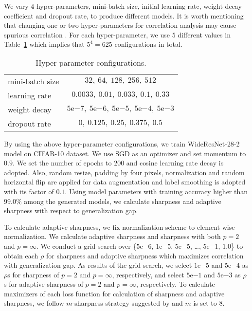 \documentclass{article}
\begin{document}
We vary $4$ hyper-parameters, mini-batch size, initial learning rate, weight decay coefficient and dropout rate, to produce different models. It is worth mentioning that changing one or two hyper-parameters for correlation analysis may cause spurious correlation \cite{jiang2019fantastic}. For each hyper-parameter, we use $5$ different values in Table~\ref{hyper} which implies that $5^4=625$ configurations in total.

\begin{table}[h]
\centering
\captionsetup{justification=centering}
\caption{Hyper-parameter configurations. \label{hyper}}
\begin{center}
\begin{small}
\begin{tabular}{lc}
\toprule
mini-batch size & $32,~64,~128,~256,~512$\\
learning rate & $0.0033,~0.01,~0.033,~0.1,~0.33$\\
weight decay & $5\mathrm{e}{-7},~5\mathrm{e}{-6},~5\mathrm{e}{-5},~5\mathrm{e}{-4},~5\mathrm{e}{-3}$\\
dropout rate & $0,~0.125,~0.25,~0.375,~0.5$\\
\bottomrule
\end{tabular}
\end{small}
\end{center}
\end{table}

By using the above hyper-parameter configurations, we train WideResNet-28-2 model on CIFAR-10 dataset. We use SGD as an optimizer and set momentum to $0.9$. We set the number of epochs to $200$ and cosine learning rate decay \citep{loshchilov2016sgdr} is adopted. Also, random resize, padding by four pixels, normalization and random horizontal flip are applied for data augmentation and label smoothing \citep{NEURIPS2019_f1748d6b} is adopted with its factor of $0.1$. 
Using model parameters with training accuracy higher than $99.0\%$ among the generated models, we calculate sharpness and adaptive sharpness with respect to generalization gap. 

To calculate adaptive sharpness, we fix normalization scheme to element-wise normalization. We calculate adaptive sharpness and sharpness with both $p=2$ and $p=\infty$. We conduct a grid search over \{$5\mathrm{e}{-6}$, $1\mathrm{e}{-5}$, $5\mathrm{e}{-5}$, \ldots, $5\mathrm{e}{-1}$, $1.0$\} to obtain each $\rho$ for sharpness and adaptive sharpness which maximizes correlation with generalization gap. As results of the grid search, we select $1\mathrm{e}{-5}$ and $5\mathrm{e}{-4}$ as $\rho$s for sharpness of $p=2$ and $p=\infty$, respectively, and select $5\mathrm{e}{-1}$ and $5\mathrm{e}{-3}$ as $\rho$s for adaptive sharpness of $p=2$ and $p=\infty$, respectively. To calculate maximizers of each loss function for calculation of sharpness and adaptive sharpness, we follow $m$-sharpness strategy suggested by \citet{foret2021sharpnessaware} and $m$ is set to $8$.
\end{document}

